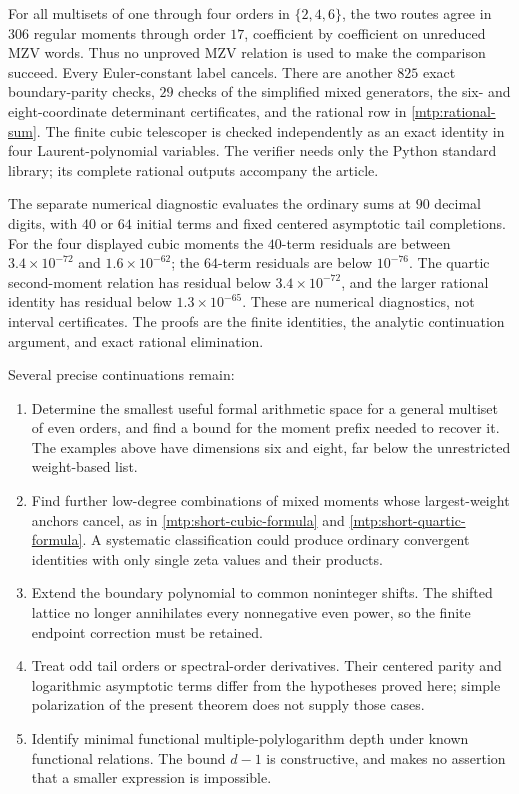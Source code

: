 \documentclass[11pt,letterpaper]{article}
\numberwithin{equation}{section}
\theoremstyle{definition}
\theoremstyle{remark}
\begin{document}
For all multisets of one through four orders in $\{2,4,6\}$, the two
routes agree in $306$ regular moments through order $17$, coefficient
by coefficient on unreduced MZV words. Thus no unproved MZV relation
is used to make the comparison succeed. Every Euler-constant label
cancels. There are another $825$ exact boundary-parity checks,
$29$ checks of the simplified mixed generators, the six- and
eight-coordinate determinant certificates, and the rational row in
\eqref{mtp:rational-sum}. The finite cubic telescoper is checked
independently as an exact identity in four Laurent-polynomial variables.
The verifier needs only the Python standard
library; its complete rational outputs accompany the article.

The separate numerical diagnostic evaluates the ordinary sums at
$90$ decimal digits, with $40$ or $64$ initial terms and fixed centered
asymptotic tail completions. For the four displayed cubic moments the
$40$-term residuals are between $3.4\times10^{-72}$ and
$1.6\times10^{-62}$; the $64$-term residuals are below $10^{-76}$.
The quartic second-moment relation has residual below $3.4\times10^{-72}$,
and the larger rational identity has residual below $1.3\times10^{-65}$.
These are numerical diagnostics, not interval certificates. The proofs
are the finite identities, the analytic continuation argument, and
exact rational elimination.

Several precise continuations remain:
\begin{enumerate}
\item Determine the smallest useful formal arithmetic space for a
      general multiset of even orders, and find a bound for the moment
      prefix needed to recover it. The examples above have dimensions
      six and eight, far below the unrestricted weight-based list.
\item Find further low-degree combinations of mixed moments whose
      largest-weight anchors cancel, as in
      \eqref{mtp:short-cubic-formula} and \eqref{mtp:short-quartic-formula}.
      A systematic classification could produce ordinary convergent
      identities with only single zeta values and their products.
\item Extend the boundary polynomial to common noninteger shifts.
      The shifted lattice no longer annihilates every nonnegative even
      power, so the finite endpoint correction must be retained.
\item Treat odd tail orders or spectral-order derivatives. Their
      centered parity and logarithmic asymptotic terms differ from the
      hypotheses proved here; simple polarization of the present
      theorem does not supply those cases.
\item Identify minimal functional multiple-polylogarithm depth under
      known functional relations. The bound $d-1$ is constructive,
      and makes no assertion that a smaller expression is impossible.
\end{enumerate}
\end{document}
